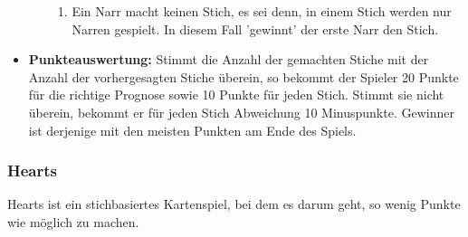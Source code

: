 \documentclass[titlepage,10pt,a4paper]{article}
\begin{document}
\begin{itemize}
\begin{itemize}
\begin{enumerate}
			\item Ein Narr macht keinen \gls{Stich}, es sei denn, in einem \gls{Stich} werden nur Narren gespielt. In diesem Fall 'gewinnt' der erste Narr den Stich.
		\end{enumerate}
	\end{itemize}
	\item \textbf{Punkteauswertung:} Stimmt die Anzahl der gemachten Stiche mit der Anzahl der vorhergesagten Stiche überein, so bekommt der Spieler 20 Punkte für die richtige Prognose sowie 10 Punkte für jeden Stich. Stimmt sie nicht überein, bekommt er für jeden Stich Abweichung 10 Minuspunkte. Gewinner ist derjenige mit den meisten Punkten am Ende des Spiels.
\end{itemize}
\subsubsection{Hearts}
Hearts ist ein stichbasiertes Kartenspiel, bei dem es darum geht, so wenig Punkte wie möglich zu machen.
\end{document}
